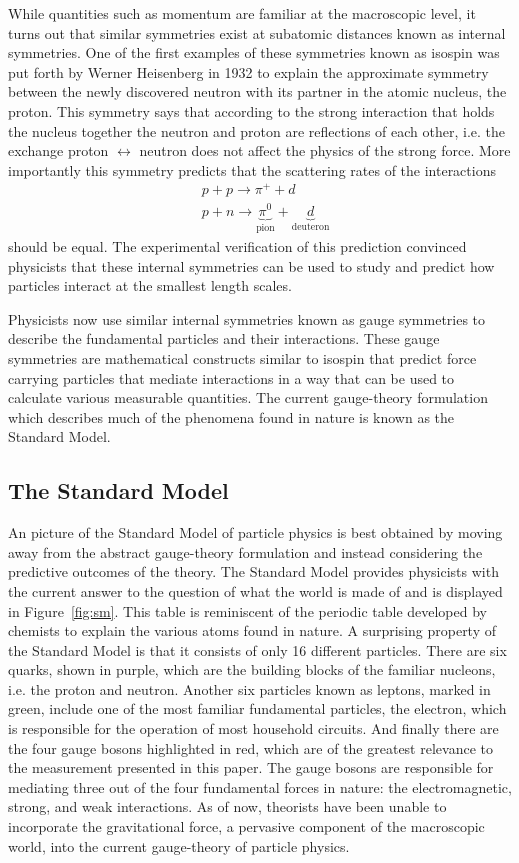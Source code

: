 While quantities such as momentum are familiar at the macroscopic level, 
it turns out that similar symmetries exist at subatomic distances
known as internal symmetries. One of the first examples of these symmetries
known as isospin was put forth by Werner Heisenberg in 1932 
to explain the approximate symmetry between
the newly discovered neutron with its partner in the atomic nucleus, the proton.
This symmetry says that according to the strong interaction that holds
the nucleus together the neutron and proton are reflections of each other,
i.e. the exchange proton $\leftrightarrow$ neutron does not affect the
physics of the strong force. More importantly this symmetry predicts that the
scattering rates of the interactions
\begin{align*}
    & p + p \rightarrow \pi^+ + d \\
    & p + n \rightarrow \underbrace{\pi^0}_{\text{pion}} + \underbrace{d}_{\text{deuteron}}
\end{align*}
should be equal. The experimental verification of this prediction convinced
physicists that these internal symmetries can be used to study and predict
how particles interact at the smallest length scales.

Physicists now use similar internal symmetries known as gauge symmetries to
describe the fundamental particles and their interactions. These gauge symmetries
are mathematical constructs similar to isospin that predict force carrying 
particles that mediate interactions in a way that can be used to calculate
various measurable quantities. The current gauge-theory formulation which describes
much of the phenomena found in nature is known as the Standard Model.

\subsection{The Standard Model}
\label{subsec:StandardModel}
An picture of the Standard Model of particle physics is best obtained
by moving away from the abstract gauge-theory formulation and instead considering
the predictive outcomes of the theory. The Standard Model provides physicists with
the current answer to the question of what the world is made of and is displayed
in Figure~\ref{fig:sm}. This table is reminiscent
of the periodic table developed by chemists to explain the various atoms
found in nature. A surprising property of the Standard Model is that it consists
of only 16 different particles. There are six quarks, shown in purple, which
are the building blocks of the familiar nucleons, i.e. the proton and neutron.
Another six particles known as leptons, marked in green, include one of
the most familiar fundamental particles, the electron, 
which is responsible for the operation of most household circuits. And
finally there are the four gauge bosons highlighted in red, which are of the 
greatest relevance to the measurement presented in this paper.
The gauge bosons are responsible for mediating three 
out of the four fundamental forces in nature: the electromagnetic, strong, and 
weak interactions. As of now, theorists have been unable to incorporate the 
gravitational force, a pervasive component of the macroscopic world,
into the current gauge-theory of particle physics.

